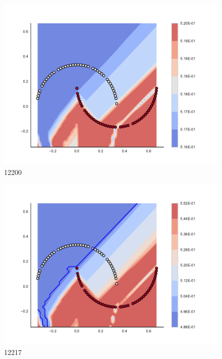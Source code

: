 \begin{subfigure}[b]{0.09\textwidth}
    \includegraphics[clip, trim=2.35cm 1.75cm 4.5cm 0cm,width=\textwidth]{img/convergence/12200.pdf}
    \caption{12200}
    \label{fig:convergence_12200}
\end{subfigure}
%
\begin{subfigure}[b]{0.09\textwidth}
    \includegraphics[clip, trim=2.35cm 1.75cm 4.5cm 0cm,width=\textwidth]{img/convergence/12217.pdf}
    \caption{12217}
    \label{fig:convergence_12217}
\end{subfigure}
%
